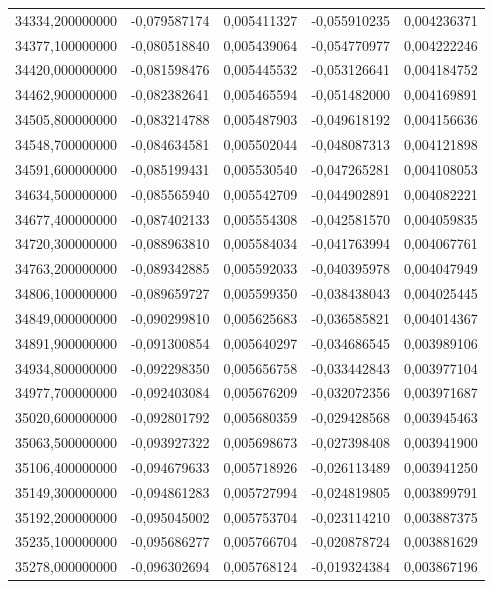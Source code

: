 \begin{longtable}{rrrrr}
34334,200000000 & -0,079587174 & 0,005411327 & -0,055910235 & 0,004236371\\
34377,100000000 & -0,080518840 & 0,005439064 & -0,054770977 & 0,004222246\\
34420,000000000 & -0,081598476 & 0,005445532 & -0,053126641 & 0,004184752\\
34462,900000000 & -0,082382641 & 0,005465594 & -0,051482000 & 0,004169891\\
34505,800000000 & -0,083214788 & 0,005487903 & -0,049618192 & 0,004156636\\
34548,700000000 & -0,084634581 & 0,005502044 & -0,048087313 & 0,004121898\\
34591,600000000 & -0,085199431 & 0,005530540 & -0,047265281 & 0,004108053\\
34634,500000000 & -0,085565940 & 0,005542709 & -0,044902891 & 0,004082221\\
34677,400000000 & -0,087402133 & 0,005554308 & -0,042581570 & 0,004059835\\
34720,300000000 & -0,088963810 & 0,005584034 & -0,041763994 & 0,004067761\\
34763,200000000 & -0,089342885 & 0,005592033 & -0,040395978 & 0,004047949\\
34806,100000000 & -0,089659727 & 0,005599350 & -0,038438043 & 0,004025445\\
34849,000000000 & -0,090299810 & 0,005625683 & -0,036585821 & 0,004014367\\
34891,900000000 & -0,091300854 & 0,005640297 & -0,034686545 & 0,003989106\\
34934,800000000 & -0,092298350 & 0,005656758 & -0,033442843 & 0,003977104\\
34977,700000000 & -0,092403084 & 0,005676209 & -0,032072356 & 0,003971687\\
35020,600000000 & -0,092801792 & 0,005680359 & -0,029428568 & 0,003945463\\
35063,500000000 & -0,093927322 & 0,005698673 & -0,027398408 & 0,003941900\\
35106,400000000 & -0,094679633 & 0,005718926 & -0,026113489 & 0,003941250\\
35149,300000000 & -0,094861283 & 0,005727994 & -0,024819805 & 0,003899791\\
35192,200000000 & -0,095045002 & 0,005753704 & -0,023114210 & 0,003887375\\
35235,100000000 & -0,095686277 & 0,005766704 & -0,020878724 & 0,003881629\\
35278,000000000 & -0,096302694 & 0,005768124 & -0,019324384 & 0,003867196\\

\end{longtable}
